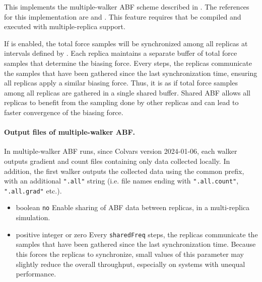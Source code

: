 This implements the multiple-walker ABF scheme described in \cite{Minoukadeh2010}. The references for this
implementation are \cite{Comer2014c} and \cite{Fiorin2024}.
This feature requires that \MDENGINE{} be compiled and executed with multiple-replica
support.

If  is enabled, the total force samples will be synchronized among all replicas
at intervals defined by .
Each replica maintains a separate buffer of total force samples that determine the biasing force.
Every  steps, the replicas communicate the samples that have been gathered since the last synchronization time, ensuring all replicas apply a similar biasing force.
Thus, it is as if total force samples among all replicas are gathered in a single shared buffer.
Shared ABF allows all replicas to benefit from the sampling done by other replicas and can lead to faster convergence of the biasing force.


\paragraph{Output files of multiple-walker ABF.}
In multiple-walker ABF runs, since Colvars version 2024-01-06, each walker outputs gradient and count files containing only data collected locally.
In addition, the first walker outputs the collected data using the common prefix, with an additional \texttt{".all"} string (i.e. file names ending with \texttt{".all.count"}, \texttt{".all.grad"} etc.).


\begin{itemize}
\item
  {boolean}
  {\texttt{no}}
  {
    Enable sharing of ABF data between replicas, in a multi-replica simulation.
  }

\item
  {positive integer or zero}
  {}
  {
    Every \texttt{sharedFreq} steps, the replicas communicate the samples that have been gathered since the last synchronization time.
    Because this forces the replicas to synchronize, small values of this parameter may slightly reduce the overall throughput, especially on systems with unequal performance.
  }
\end{itemize}

